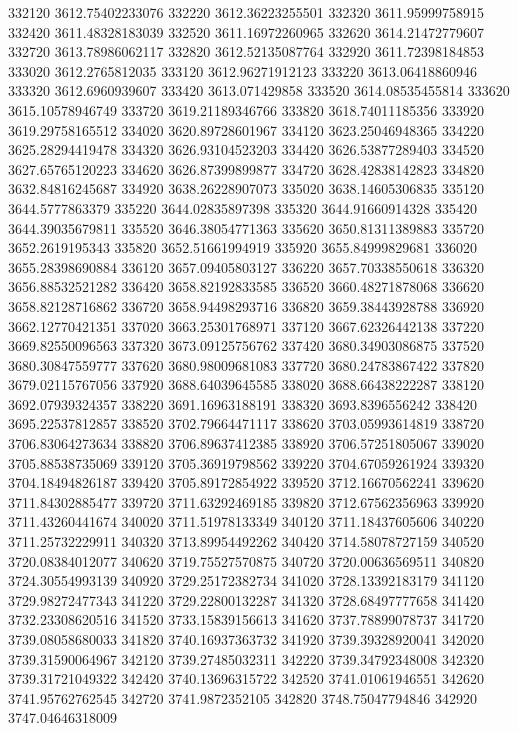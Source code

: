 {332120 3612.75402233076
332220 3612.36223255501
332320 3611.95999758915
332420 3611.48328183039
332520 3611.16972260965
332620 3614.21472779607
332720 3613.78986062117
332820 3612.52135087764
332920 3611.72398184853
333020 3612.2765812035
333120 3612.96271912123
333220 3613.06418860946
333320 3612.6960939607
333420 3613.071429858
333520 3614.08535455814
333620 3615.10578946749
333720 3619.21189346766
333820 3618.74011185356
333920 3619.29758165512
334020 3620.89728601967
334120 3623.25046948365
334220 3625.28294419478
334320 3626.93104523203
334420 3626.53877289403
334520 3627.65765120223
334620 3626.87399899877
334720 3628.42838142823
334820 3632.84816245687
334920 3638.26228907073
335020 3638.14605306835
335120 3644.5777863379
335220 3644.02835897398
335320 3644.91660914328
335420 3644.39035679811
335520 3646.38054771363
335620 3650.81311389883
335720 3652.2619195343
335820 3652.51661994919
335920 3655.84999829681
336020 3655.28398690884
336120 3657.09405803127
336220 3657.70338550618
336320 3656.88532521282
336420 3658.82192833585
336520 3660.48271878068
336620 3658.82128716862
336720 3658.94498293716
336820 3659.38443928788
336920 3662.12770421351
337020 3663.25301768971
337120 3667.62326442138
337220 3669.82550096563
337320 3673.09125756762
337420 3680.34903086875
337520 3680.30847559777
337620 3680.98009681083
337720 3680.24783867422
337820 3679.02115767056
337920 3688.64039645585
338020 3688.66438222287
338120 3692.07939324357
338220 3691.16963188191
338320 3693.8396556242
338420 3695.22537812857
338520 3702.79664471117
338620 3703.05993614819
338720 3706.83064273634
338820 3706.89637412385
338920 3706.57251805067
339020 3705.88538735069
339120 3705.36919798562
339220 3704.67059261924
339320 3704.18494826187
339420 3705.89172854922
339520 3712.16670562241
339620 3711.84302885477
339720 3711.63292469185
339820 3712.67562356963
339920 3711.43260441674
340020 3711.51978133349
340120 3711.18437605606
340220 3711.25732229911
340320 3713.89954492262
340420 3714.58078727159
340520 3720.08384012077
340620 3719.75527570875
340720 3720.00636569511
340820 3724.30554993139
340920 3729.25172382734
341020 3728.13392183179
341120 3729.98272477343
341220 3729.22800132287
341320 3728.68497777658
341420 3732.23308620516
341520 3733.15839156613
341620 3737.78899078737
341720 3739.08058680033
341820 3740.16937363732
341920 3739.39328920041
342020 3739.31590064967
342120 3739.27485032311
342220 3739.34792348008
342320 3739.31721049322
342420 3740.13696315722
342520 3741.01061946551
342620 3741.95762762545
342720 3741.9872352105
342820 3748.75047794846
342920 3747.04646318009
}
